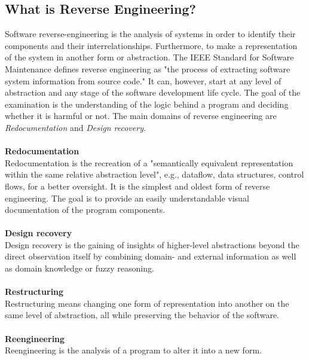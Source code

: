 \documentclass[seminar]{plai}
\begin{document}
\subsection{What is Reverse Engineering?}
\label{sec:reverse-engineering-background}
Software reverse-engineering is the analysis of systems in order to identify their components and their interrelationships. Furthermore, to make a representation of the system in another form or abstraction.\cite{reverse-engineering-design-recovery-taxonomy}
The IEEE Standard for Software Maintenance defines reverse engineering as "the process of extracting software system information from source code."\cite{ieeeStandard-for-SW-maintenance}
It can, however, start at any level of abstraction and any stage of the software development life cycle. The goal of the examination is the understanding of the logic behind a program and deciding whether it is harmful or not. The main domains of reverse engineering are \textit{Redocumentation} and \textit{Design recovery}.
\\\\
\textbf{Redocumentation}\\
Redocumentation is the recreation of a "semantically equivalent representation within the same relative abstraction level"\cite[p.15]{reverse-engineering-design-recovery-taxonomy}, e.g., dataflow, data structures, control flows, for a better oversight.
It is the simplest and oldest form of reverse engineering. The goal is to provide an easily understandable visual documentation of the program components.\cite{reverse-engineering-design-recovery-taxonomy}
\\\\
\textbf{Design recovery}\\
Design recovery is the gaining of insights of higher-level abstractions beyond the direct observation itself by combining domain- and external information as well as domain knowledge or fuzzy reasoning.\cite{reverse-engineering-design-recovery-taxonomy}
\\\\
\textbf{Restructuring}\\
Restructuring means changing one form of representation into another on the same level of abstraction, all while preserving the behavior of the software.\cite{reverse-engineering-design-recovery-taxonomy}
\\\\
\textbf{Reengineering}\\
Reengineering is the analysis of a program to alter it into a new form.
\end{document}
